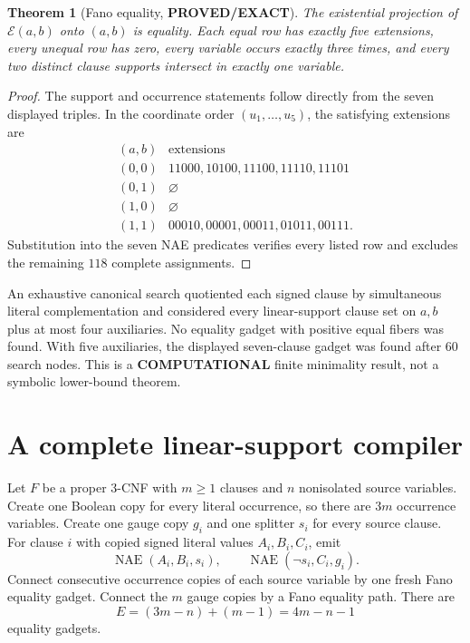 \documentclass[11pt]{article}
\newtheorem{theorem}{Theorem}
\newcommand{\EXACT}{\textbf{PROVED/EXACT}}
\newcommand{\COMP}{\textbf{COMPUTATIONAL}}
\begin{document}
\begin{theorem}[Fano equality, \EXACT]
The existential projection of $\mathcal E(a,b)$ onto $(a,b)$ is equality.
Each equal row has exactly five extensions, every unequal row has zero, every
variable occurs exactly three times, and every two distinct clause supports
intersect in exactly one variable.
\end{theorem}
\begin{proof}
The support and occurrence statements follow directly from the seven displayed
triples.  In the coordinate order $(u_1,\ldots,u_5)$, the satisfying extensions
are
\[
\begin{array}{c|c}
(a,b)&\text{extensions}\\ \hline
(0,0)&11000,10100,11100,11110,11101\\
(0,1)&\varnothing\\
(1,0)&\varnothing\\
(1,1)&00010,00001,00011,01011,00111.
\end{array}
\]
Substitution into the seven NAE predicates verifies every listed row and
excludes the remaining $118$ complete assignments.
\end{proof}

An exhaustive canonical search quotiented each signed clause by simultaneous
literal complementation and considered every linear-support clause set on
$a,b$ plus at most four auxiliaries.  No equality gadget with positive equal
fibers was found.  With five auxiliaries, the displayed seven-clause gadget
was found after 60 search nodes.  This is a \COMP{} finite minimality result,
not a symbolic lower-bound theorem.

\section{A complete linear-support compiler}
Let $F$ be a proper 3-CNF with $m\geq1$ clauses and $n$ nonisolated source
variables.  Create one Boolean copy for every literal occurrence, so there are
$3m$ occurrence variables.  Create one gauge copy $g_i$ and one splitter $s_i$
for every source clause.  For clause $i$ with copied signed literal values
$A_i,B_i,C_i$, emit
\[
\operatorname{NAE}(A_i,B_i,s_i),\qquad
\operatorname{NAE}(\neg s_i,C_i,g_i).
\]
Connect consecutive occurrence copies of each source variable by one fresh
Fano equality gadget.  Connect the $m$ gauge copies by a Fano equality path.
There are
\[
E=(3m-n)+(m-1)=4m-n-1
\]
equality gadgets.
\end{document}
